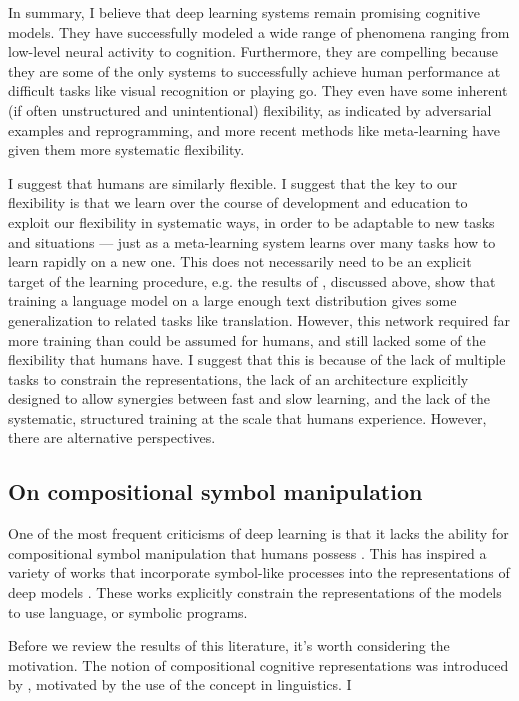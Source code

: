 In summary, I believe that deep learning systems remain promising cognitive models. They have successfully modeled a wide range of phenomena ranging from low-level neural activity to cognition. Furthermore, they are compelling because they are some of the only systems to successfully achieve human performance at difficult tasks like visual recognition or playing go. They even have some inherent (if often unstructured and unintentional) flexibility, as indicated by adversarial examples and reprogramming, and more recent methods like meta-learning have given them more systematic flexibility. \par
I suggest that humans are similarly flexible. I suggest that the key to our flexibility is that we learn over the course of development and education to exploit our flexibility in systematic ways, in order to be adaptable to new tasks and situations --- just as a meta-learning system learns over many tasks how to learn rapidly on a new one. This does not necessarily need to be an explicit target of the learning procedure, e.g. the results of \citet{Radford2019}, discussed above, show that training a language model on a large enough text distribution gives some generalization to related tasks like translation. However, this network required far more training than could be assumed for humans, and still lacked some of the flexibility that humans have. I suggest that this is because of the lack of multiple tasks to constrain the representations, the lack of an architecture explicitly designed to allow synergies between fast and slow learning, and the lack of the systematic, structured training at the scale that humans experience. However, there are alternative perspectives. \par 

\subsection{On compositional symbol manipulation} \label{sec:introduction:on_compositional}

One of the most frequent criticisms of deep learning is that it lacks the ability for compositional symbol manipulation that humans possess \citep[][see also above]{Fodor1988, Lake2016,Lake2017,Marcus2018}. This has inspired a variety of works that incorporate symbol-like processes into the representations of deep models \citep[e.g.][]{Andreas2017,Mao2019}. These works explicitly constrain the representations of the models to use language, or symbolic programs. \par 
Before we review the results of this literature, it's worth considering the motivation. The notion of compositional cognitive representations was introduced by \citet{Fodor1988}, motivated by the use of the concept in linguistics. I 

